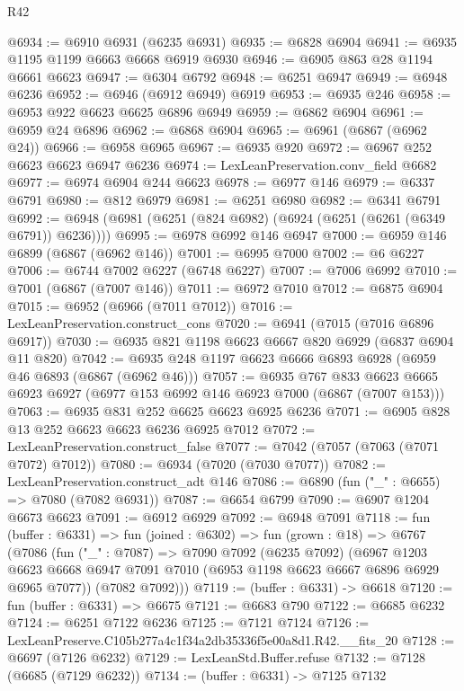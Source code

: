 \begin{lexlean}{R42}
\begin{coremodule}
{@6934 := @6910 @6931 (@6235 @6931)
@6935 := @6828 @6904
@6941 := @6935 @1195 @1199 @6663 @6668 @6919 @6930
@6946 := @6905 @863 @28 @1194 @6661 @6623
@6947 := @6304 @6792
@6948 := @6251 @6947
@6949 := @6948 @6236
@6952 := @6946 (@6912 @6949) @6919
@6953 := @6935 @246
@6958 := @6953 @922 @6623 @6625 @6896 @6949
@6959 := @6862 @6904
@6961 := @6959 @24 @6896
@6962 := @6868 @6904
@6965 := @6961 (@6867 (@6962 @24))
@6966 := @6958 @6965
@6967 := @6935 @920
@6972 := @6967 @252 @6623 @6623 @6947 @6236
@6974 := LexLeanPreservation.conv_field @6682
@6977 := @6974 @6904 @244 @6623
@6978 := @6977 @146
@6979 := @6337 @6791
@6980 := @812 @6979
@6981 := @6251 @6980
@6982 := @6341 @6791
@6992 := @6948 (@6981 (@6251 (@824 @6982) (@6924 (@6251 (@6261 (@6349 @6791)) @6236))))
@6995 := @6978 @6992 @146 @6947
@7000 := @6959 @146 @6899 (@6867 (@6962 @146))
@7001 := @6995 @7000
@7002 := @6 @6227
@7006 := @6744 @7002 @6227 (@6748 @6227)
@7007 := @7006 @6992
@7010 := @7001 (@6867 (@7007 @146))
@7011 := @6972 @7010
@7012 := @6875 @6904
@7015 := @6952 (@6966 (@7011 @7012))
@7016 := LexLeanPreservation.construct_cons
@7020 := @6941 (@7015 (@7016 @6896 @6917))
@7030 := @6935 @821 @1198 @6623 @6667 @820 @6929 (@6837 @6904 @11 @820)
@7042 := @6935 @248 @1197 @6623 @6666 @6893 @6928 (@6959 @46 @6893 (@6867 (@6962 @46)))
@7057 := @6935
    @767
    @833
    @6623
    @6665
    @6923
    @6927
    (@6977 @153 @6992 @146 @6923 @7000 (@6867 (@7007 @153)))
@7063 := @6935 @831 @252 @6625 @6623 @6925 @6236
@7071 := @6905 @828 @13 @252 @6623 @6623 @6236 @6925 @7012
@7072 := LexLeanPreservation.construct_false
@7077 := @7042 (@7057 (@7063 (@7071 @7072) @7012))
@7080 := @6934 (@7020 (@7030 @7077))
@7082 := LexLeanPreservation.construct_adt @146
@7086 := @6890 (fun ("_" : @6655) => @7080 (@7082 @6931))
@7087 := @6654 @6799
@7090 := @6907 @1204 @6673 @6623
@7091 := @6912 @6929
@7092 := @6948 @7091
@7118 := fun (buffer : @6331) =>
  fun (joined : @6302) =>
  fun (grown : @18) =>
  @6767
    (@7086
      (fun ("_" : @7087) =>
      @7090
        @7092
        (@6235 @7092)
        (@6967
          @1203
          @6623
          @6668
          @6947
          @7091
          @7010
          (@6953 @1198 @6623 @6667 @6896 @6929 @6965 @7077))
        (@7082 @7092)))
@7119 := (buffer : @6331) -> @6618
@7120 := fun (buffer : @6331) => @6675
@7121 := @6683 @790
@7122 := @6685 @6232
@7124 := @6251 @7122 @6236
@7125 := @7121 @7124
@7126 := LexLeanPreserve.C105b277a4c1f34a2db35336f5e00a8d1.R42.__fits_20
@7128 := @6697 (@7126 @6232)
@7129 := LexLeanStd.Buffer.refuse
@7132 := @7128 (@6685 (@7129 @6232))
@7134 := (buffer : @6331) -> @7125 @7132
}
\end{coremodule}
\end{lexlean}

